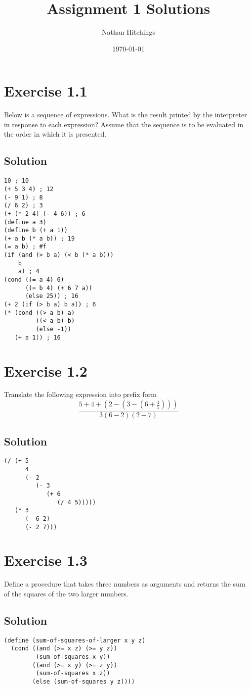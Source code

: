 \documentclass[11pt]{article}
\author{Nathan Hitchings}
\date{\today}
\title{Assignment 1 Solutions}
\begin{document}
\maketitle
\section{Exercise 1.1}
\label{sec:orge6257d6}
Below is a sequence of expressions. What is the result printed by the
interpreter in response to each expression? Assume that the sequence is
to be evaluated in the order in which it is presented.
\subsection{Solution}
\label{sec:orgd325574}
\begin{verbatim}
10 ; 10
(+ 5 3 4) ; 12
(- 9 1) ; 8
(/ 6 2) ; 3
(+ (* 2 4) (- 4 6)) ; 6
(define a 3)
(define b (+ a 1))
(+ a b (* a b)) ; 19
(= a b) ; #f
(if (and (> b a) (< b (* a b)))
    b
    a) ; 4
(cond ((= a 4) 6)
      ((= b 4) (+ 6 7 a))
      (else 25)) ; 16
(+ 2 (if (> b a) b a)) ; 6
(* (cond ((> a b) a)
         ((< a b) b)
         (else -1))
   (+ a 1)) ; 16
\end{verbatim}

\section{Exercise 1.2}
\label{sec:org617070e}
Translate the following expression into prefix form
\begin{equation}
\frac{5+4+(2-(3-(6+\frac{4}{5})))}{3(6-2)(2-7)}
\end{equation}
\subsection{Solution}
\label{sec:org4d4592a}
\begin{verbatim}
(/ (+ 5
      4
      (- 2
         (- 3
            (+ 6
               (/ 4 5)))))
   (* 3
      (- 6 2)
      (- 2 7)))
\end{verbatim}

\section{Exercise 1.3}
\label{sec:orgee67e62}
Define a procedure that takes three numbers as arguments and returns the
sum of the squares of the two larger numbers.
\subsection{Solution}
\label{sec:org0bbaf8c}
\begin{verbatim}
(define (sum-of-squares-of-larger x y z)
  (cond ((and (>= x z) (>= y z))
         (sum-of-squares x y))
        ((and (>= x y) (>= z y))
         (sum-of-squares x z))
        (else (sum-of-squares y z))))
\end{verbatim}
\end{document}
